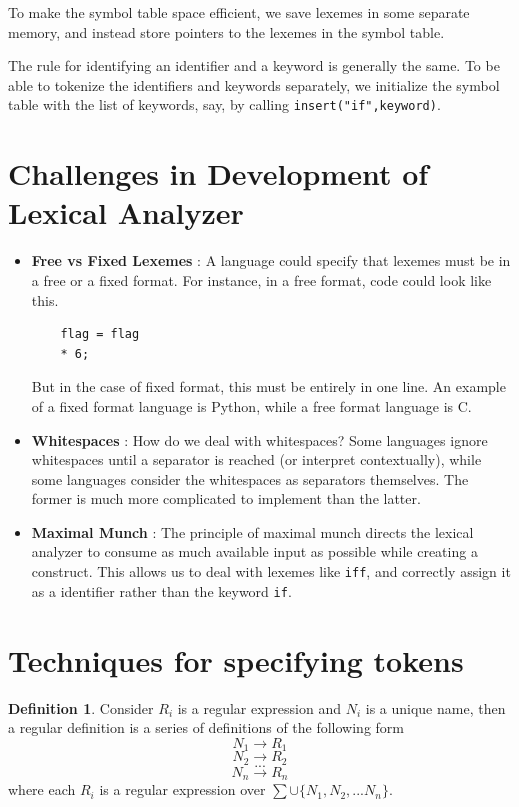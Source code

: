 \documentclass[12pt,letterpaper]{amsbook}
\theoremstyle{definition}
\newtheorem{definition}{Definition}[section] %
\begin{document}
To make the symbol table space efficient, we save lexemes in some separate memory, and instead store pointers to the lexemes in the symbol table.

The rule for identifying an identifier and a keyword is generally the same. To be able to tokenize the identifiers and keywords separately, we initialize the symbol table with the list of keywords, say, by calling \texttt{insert("if",keyword)}.

\section{Challenges in Development of Lexical Analyzer}

\begin{itemize}
  \item \textbf{Free vs Fixed Lexemes} : A language could specify that lexemes must be in a free or a fixed format. For instance, in a free format, code could look like this.
    \begin{verbatim}
    flag = flag
    * 6;
    \end{verbatim}
    But in the case of fixed format, this must be entirely in one line. An example of a fixed format language is Python, while a free format language is C.
  \item \textbf{Whitespaces} : How do we deal with whitespaces? Some languages ignore whitespaces until a separator is reached (or interpret contextually), while some languages consider the whitespaces as separators themselves. The former is much more complicated to implement than the latter.
  \item \textbf{Maximal Munch} : The principle of maximal munch directs the lexical analyzer to consume as much available input as possible while creating a construct. This allows us to deal with lexemes like \texttt{iff}, and correctly assign it as a identifier rather than the keyword \texttt{if}.
\end{itemize}

\section{Techniques for specifying tokens} 

\begin{definition}
  Consider $R_i$ is a regular expression and $N_i$ is a unique name, then a regular definition is a series of definitions of the following form 
  \[N_1 \rightarrow R_1 \]
  \[N_2 \rightarrow R_2 \]
  \[...\]
  \[N_n \rightarrow R_n \]
  where each $R_i$ is a regular expression over $\sum \cup \{N_1,N_2,...N_n\}$.
\end{definition}
\end{document}
